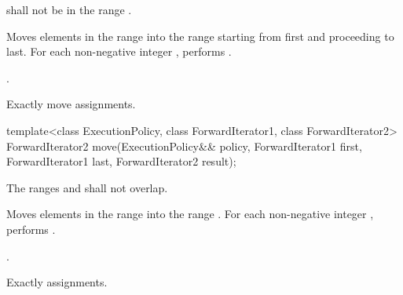 \begin{itemdescr}
\pnum
\requires
{}
shall not be in the range
.

\pnum
\effects
Moves elements in the range 
into the range 
starting from first and proceeding to last.
For each non-negative integer
,
performs
.

\pnum
\returns
{}.

\pnum
\complexity
Exactly
move assignments.
\end{itemdescr}

%
\begin{itemdecl}
template<class ExecutionPolicy, class ForwardIterator1, class ForwardIterator2>
  ForwardIterator2 move(ExecutionPolicy&& policy,
                        ForwardIterator1 first, ForwardIterator1 last,
                        ForwardIterator2 result);
\end{itemdecl}

\begin{itemdescr}
\pnum
\requires The ranges  and
 shall not overlap.

\pnum
\effects Moves elements in the range  into
the range .
For each non-negative integer ,
performs .

\pnum
\returns {}.

\pnum
\complexity Exactly  assignments.
\end{itemdescr}

